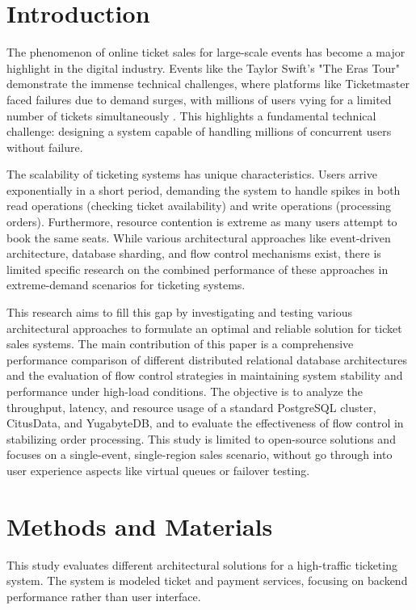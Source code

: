 \section{Introduction}
\label{sec:introduction}

The phenomenon of online ticket sales for large-scale events has become a major highlight in the digital industry. Events like the Taylor Swift's "The Eras Tour" demonstrate the immense technical challenges, where platforms like Ticketmaster faced failures due to demand surges, with millions of users vying for a limited number of tickets simultaneously \cite{swiftTicketmaster}. This highlights a fundamental technical challenge: designing a system capable of handling millions of concurrent users without failure.

The scalability of ticketing systems has unique characteristics. Users arrive exponentially in a short period, demanding the system to handle spikes in both read operations (checking ticket availability) and write operations (processing orders). Furthermore, resource contention is extreme as many users attempt to book the same seats. While various architectural approaches like event-driven architecture, database sharding, and flow control mechanisms exist, there is limited specific research on the combined performance of these approaches in extreme-demand scenarios for ticketing systems.

This research aims to fill this gap by investigating and testing various architectural approaches to formulate an optimal and reliable solution for ticket sales systems. The main contribution of this paper is a comprehensive performance comparison of different distributed relational database architectures and the evaluation of flow control strategies in maintaining system stability and performance under high-load conditions. The objective is to analyze the throughput, latency, and resource usage of a standard PostgreSQL cluster, CitusData, and YugabyteDB, and to evaluate the effectiveness of flow control in stabilizing order processing. This study is limited to open-source solutions and focuses on a single-event, single-region sales scenario, without go through into user experience aspects like virtual queues or failover testing.

\section{Methods and Materials}
\label{sec:methods}
This study evaluates different architectural solutions for a high-traffic ticketing system. The system is modeled ticket and payment services, focusing on backend performance rather than user interface.

